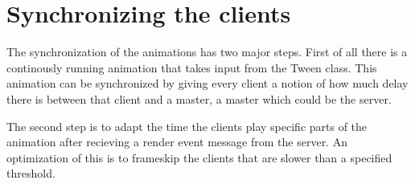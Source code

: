 \chapter{Synchronizing the clients}

The synchronization of the animations has two major steps. First of all there is a continously running animation that takes input from the Tween class. This animation can be synchronized by giving every client a notion of how much delay there is between that client and a master, a master which could be the server.

The second step is to adapt the time the clients play specific parts of the animation after recieving a render event message from the server. An optimization of this is to frameskip the clients that are slower than a specified threshold.



